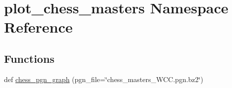 \hypertarget{namespaceplot__chess__masters}{}\section{plot\+\_\+chess\+\_\+masters Namespace Reference}
\label{namespaceplot__chess__masters}
\subsection*{Functions}
\begin{DoxyCompactItemize}
\item 
def \hyperlink{namespaceplot__chess__masters_af98462d231a4f0d13d13c99476716cac}{chess\+\_\+pgn\+\_\+graph} (pgn\+\_\+file=\char`\"{}chess\+\_\+masters\+\_\+\+W\+C\+C.\+pgn.\+bz2\char`\"{})
\end{DoxyCompactItemize}
